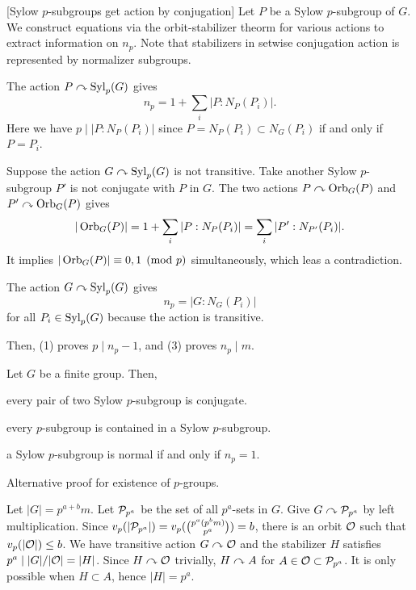 \documentclass{../exp}
\begin{document}
\begin{pf}
\bigskip
{}[Sylow $p$-subgroups get action by conjugation]
Let $P$ be a Sylow $p$-subgroup of $G$.
We construct equations via the orbit-stabilizer theorm for various actions to extract information on $n_p$.
Note that stabilizers in setwise conjugation action is represented by normalizer subgroups.
\begin{cond}
\item The action $P\curvearrowright\operatorname{Syl}_p(G)$ gives
\[n_p=1+\sum_i|P:N_P(P_i)|.\]
Here we have $p\mid |P:N_P(P_i)|$ since $P=N_P(P_i)\subset N_G(P_i)$ if and only if $P=P_i$.
\item Suppose the action $G\curvearrowright\operatorname{Syl}_p(G)$ is not transitive.
Take another Sylow $p$-subgroup $P'$ is not conjugate with $P$ in $G$.
The two actions $P\curvearrowright\operatorname{Orb}_G(P)$ and $P'\curvearrowright\operatorname{Orb}_G(P)$ gives
\[|\operatorname{Orb}_G(P)|=1+\sum_i|P:N_P(P_i)|=\sum_i|P':N_{P'}(P_i)|.\]
It implies $|\operatorname{Orb}_G(P)|\equiv0,1\pmod{p}$ simultaneously, which leas a contradiction.
\item The action $G\curvearrowright\operatorname{Syl}_p(G)$ gives
\[n_p=|G:N_G(P_i)|\]
for all $P_i\in\operatorname{Syl}_p(G)$ because the action is transitive.
\end{cond}
Then, (1) proves $p\mid n_p-1$, and (3) proves $n_p\mid m$.
\end{pf}

\begin{cor}
Let $G$ be a finite group.
Then,
\begin{cond}
\item every pair of two Sylow $p$-subgroup is conjugate.
\item every $p$-subgroup is contained in a Sylow $p$-subgroup.
\item a Sylow $p$-subgroup is normal if and only if $n_p=1$.
\end{cond}
\end{cor}

\begin{thm}
Alternative proof for existence of $p$-groups.
\end{thm}
\begin{pf}
Let $|G|=p^{a+b}m$.
Let $\mathcal{P}_{p^a}$ be the set of all $p^a$-sets in $G$.
Give $G\curvearrowright\mathcal{P}_{p^a}$ by left multiplication.
Since $v_p(|\mathcal{P}_{p^a}|)=v_p({p^a(p^bm)\choose p^a})=b$, there is an orbit $\mathcal{O}$ such that $v_p(|\mathcal{O}|)\le b$.
We have transitive action $G\curvearrowright\mathcal{O}$ and the stabilizer $H$ satisfies $p^a\mid|G|/|\mathcal{O}|=|H|$.
Since $H\curvearrowright\mathcal{O}$ trivially, $H\curvearrowright A$ for $A\in\mathcal{O}\subset\mathcal{P}_{p^a}$.
It is only possible when $H\subset A$, hence $|H|=p^a$.
\end{pf}
\end{document}

